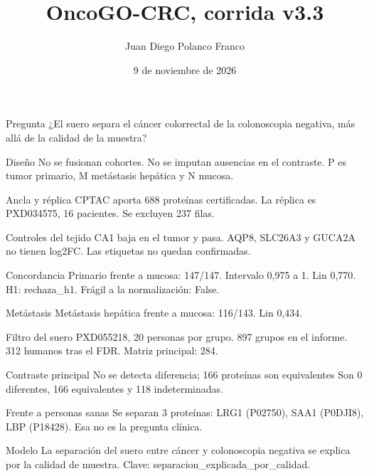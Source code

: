 \documentclass{beamer}
\title{OncoGO-CRC, corrida v3.3}
\author{Juan Diego Polanco Franco}
\date{9 de noviembre de 2026}
\begin{document}
\begin{frame}{Pregunta}
¿El suero separa el cáncer colorrectal de la colonoscopia negativa, más allá de la calidad de la muestra?
\end{frame}

\begin{frame}{Diseño}
No se fusionan cohortes. No se imputan ausencias en el contraste. P es tumor primario, M metástasis hepática y N mucosa.
\end{frame}

\begin{frame}{Ancla y réplica}
CPTAC aporta 688 proteínas certificadas. La réplica es PXD034575, 16 pacientes. Se excluyen 237 filas.
\end{frame}

\begin{frame}{Controles del tejido}
CA1 baja en el tumor y pasa. AQP8, SLC26A3 y GUCA2A no tienen log2FC. Las etiquetas no quedan confirmadas.
\end{frame}

\begin{frame}{Concordancia}
Primario frente a mucosa: 147/147. Intervalo 0,975 a 1. Lin 0,770. H1: rechaza\_h1. Frágil a la normalización: False.
\end{frame}

\begin{frame}{Metástasis}
Metástasis hepática frente a mucosa: 116/143. Lin 0,434.
\end{frame}

\begin{frame}{Filtro del suero}
PXD055218, 20 personas por grupo. 897 grupos en el informe. 312 humanos tras el FDR. Matriz principal: 284.
\end{frame}

\begin{frame}{Contraste principal}
No se detecta diferencia; 166 proteínas son equivalentes Son 0 diferentes, 166 equivalentes y 118 indeterminadas.
\end{frame}

\begin{frame}{Frente a personas sanas}
Se separan 3 proteínas: LRG1 (P02750), SAA1 (P0DJI8), LBP (P18428). Esa no es la pregunta clínica.
\end{frame}

\begin{frame}{Modelo}
La separación del suero entre cáncer y colonoscopia negativa se explica por la calidad de muestra. Clave: separacion_explicada_por_calidad.
\end{frame}
\end{document}

